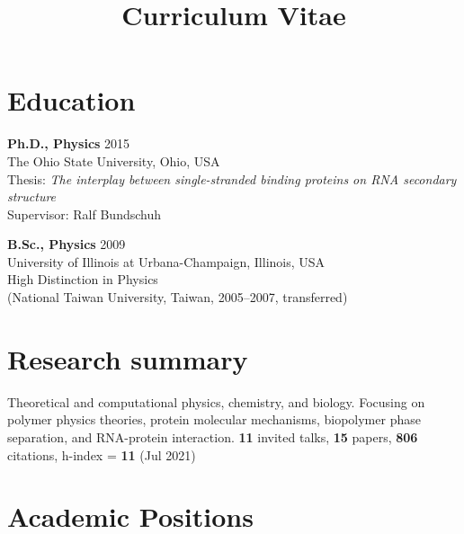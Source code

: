 \documentclass[11pt]{../yhlcv}
\begin{document}
\title{Curriculum Vitae}

\maketitle

\raggedright

\section*{Education}

{\bf Ph.D., Physics} \hfill 2015 \vspace{0.25em}\\
The Ohio State University, Ohio, USA \\
Thesis: {\it  The interplay between single-stranded binding proteins on RNA secondary structure} \\
Supervisor: Ralf Bundschuh

{\bf B.Sc., Physics} \hfill 2009 \vspace{0.25em}\\
University of Illinois at Urbana-Champaign, Illinois, USA \\
High Distinction in Physics \\
{\small (National Taiwan University, Taiwan, 2005--2007, transferred)}

\section*{Research summary}

Theoretical and computational physics, chemistry, and biology. Focusing on polymer physics theories, protein molecular mechanisms, biopolymer phase separation, and RNA-protein interaction. 
{\bf 11} invited talks, {\bf 15} papers, {\bf 806} citations, h-index = {\bf 11} (Jul 2021)

\section*{Academic Positions}
\end{document}
